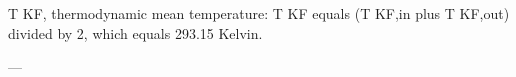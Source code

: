 T KF, thermodynamic mean temperature:  
T KF equals (T KF,in plus T KF,out) divided by 2, which equals 293.15 Kelvin.  

---
